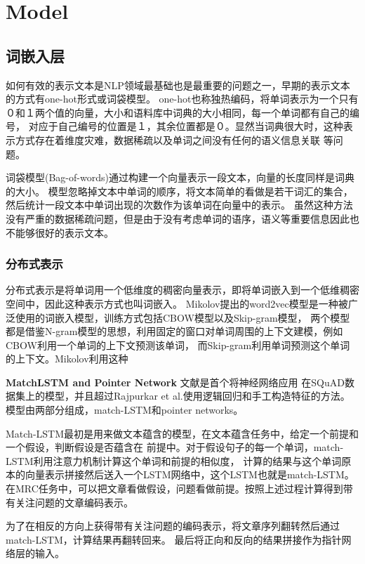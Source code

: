 \section{Model}

\subsection{词嵌入层}
如何有效的表示文本是NLP领域最基础也是最重要的问题之一，早期的表示文本的方式有one-hot形式或词袋模型。
one-hot也称独热编码，将单词表示为一个只有０和１两个值的向量，大小和语料库中词典的大小相同，每一个单词都有自己的编号，
对应于自己编号的位置是１，其余位置都是０。显然当词典很大时，这种表示方式存在着维度灾难，数据稀疏以及单词之间没有任何的语义信息关联
等问题。

词袋模型(Bag-of-words)通过构建一个向量表示一段文本，向量的长度同样是词典的大小。
模型忽略掉文本中单词的顺序，将文本简单的看做是若干词汇的集合，然后统计一段文本中单词出现的次数作为该单词在向量中的表示。
虽然这种方法没有严重的数据稀疏问题，但是由于没有考虑单词的语序，语义等重要信息因此也不能够很好的表示文本。

\subsubsection{分布式表示}
分布式表示是将单词用一个低维度的稠密向量表示，即将单词嵌入到一个低维稠密空间中，因此这种表示方式也叫词嵌入。
Mikolov提出的word2vec模型是一种被广泛使用的词嵌入模型，训练方式包括CBOW模型以及Skip-gram模型，
两个模型都是借鉴N-gram模型的思想，利用固定的窗口对单词周围的上下文建模，例如CBOW利用一个单词的上下文预测该单词，
而Skip-gram利用单词预测这个单词的上下文。Mikolov利用这种


\textbf{ MatchLSTM and Pointer Network}
文献是首个将神经网络应用
在SQuAD数据集上的模型，并且超过Rajpurkar et al.使用逻辑回归和手工构造特征的方法。
模型由两部分组成，match-LSTM和pointer networks。

Match-LSTM最初是用来做文本蕴含的模型，在文本蕴含任务中，给定一个前提和一个假设，判断假设是否蕴含在
前提中。对于假设句子的每一个单词，match-LSTM利用注意力机制计算这个单词和前提的相似度，
计算的结果与这个单词原本的向量表示拼接然后送入一个LSTM网络中，这个LSTM也就是match-LSTM。
在MRC任务中，可以把文章看做假设，问题看做前提。按照上述过程计算得到带有关注问题的文章编码表示。




为了在相反的方向上获得带有关注问题的编码表示，将文章序列翻转然后通过match-LSTM，计算结果再翻转回来。
最后将正向和反向的结果拼接作为指针网络层的输入。

